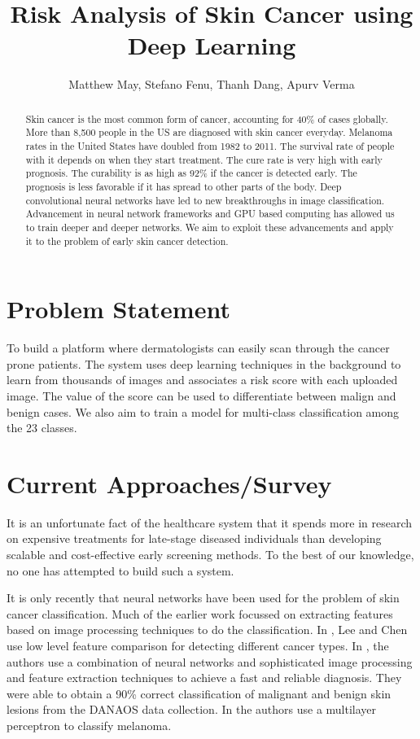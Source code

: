 \documentclass[a4paper,10pt]{article}
\title{Risk Analysis of Skin Cancer using Deep Learning}
\author{Matthew May, Stefano Fenu, Thanh Dang, Apurv Verma}
\begin{document}
\maketitle

\begin{abstract}
Skin cancer is the most common form of cancer, accounting for 40\% of cases globally.
More than 8,500 people in the US are diagnosed with skin cancer everyday. Melanoma rates in the United States have doubled from 1982 to 2011.
The survival rate of people with it depends on when they start treatment. The cure rate is very high
with early prognosis. The curability is as high as 92\% if the cancer is detected early. The prognosis is less favorable 
if it has spread to other parts of the body.
Deep convolutional neural networks have led to new breakthroughs in image classification.
Advancement in neural network frameworks and GPU based computing has allowed us to train deeper and deeper networks.
We aim to exploit these advancements and apply it to the problem of early skin cancer detection.
\end{abstract}

\section{Problem Statement}
To build a platform where dermatologists can easily scan through the cancer prone patients. The system uses deep learning
techniques in the background to learn from thousands of images and associates a risk score with each uploaded image. The value of the
score can be used to differentiate between malign and benign cases. We also aim to train a model for multi-class classification among the
23 classes.

\section{Current Approaches/Survey}
It is an unfortunate fact of the healthcare system that it spends more in research on expensive treatments for late-stage diseased individuals
than developing scalable and cost-effective early screening methods. To the best of our knowledge, no one has attempted to build such a system.

It is only recently that neural networks have been used for the problem of skin cancer classification. Much of the earlier work focussed
on extracting features based on image processing techniques to do the classification. In \cite{DBLP:journals/eswa/LeeC15}, Lee and Chen use low
level feature comparison for detecting different cancer types. In \cite{Kreutz2001}, the authors use a combination of neural networks and 
sophisticated image processing and feature extraction techniques to achieve a fast and reliable diagnosis. They were able to obtain a 
90\% correct classification of malignant and benign skin lesions from the DANAOS data collection. In \cite{Sheha_automaticdetection} the authors use 
a multilayer perceptron to classify melanoma. 
\end{document}
